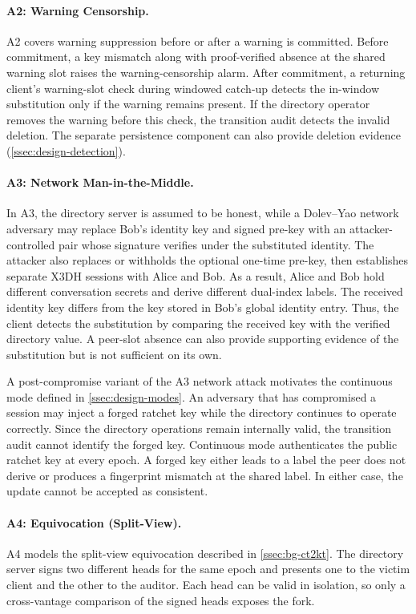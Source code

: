 \label{sc:threat-a2}\paragraph{A2: Warning Censorship.} A2 covers warning suppression
before or after a warning is committed. Before commitment, a key mismatch along with
proof-verified absence at the shared warning slot raises the warning-censorship alarm. After
commitment, a returning client's warning-slot check during windowed catch-up detects the in-window
substitution only if the warning remains present. If the directory operator removes the warning
before this check, the transition audit detects the invalid deletion. The separate persistence
component can also provide deletion evidence (\cref{ssec:design-detection}).

\label{sc:threat-a3}\paragraph{A3: Network Man-in-the-Middle.} In A3, the directory
server is assumed to be honest, while a Dolev--Yao network adversary may replace Bob's identity key
and signed pre-key with an attacker-controlled pair whose signature verifies under the substituted
identity. The attacker also replaces or withholds the optional one-time pre-key, then establishes
separate X3DH sessions with Alice and Bob. As a result, Alice and Bob hold different conversation
secrets and derive different dual-index labels. The received identity key differs from the key
stored in Bob's global identity entry. Thus, the client detects the substitution by comparing the
received key with the verified directory value. A peer-slot absence can also provide supporting
evidence of the substitution but is not sufficient on its own.

A post-compromise variant of the A3 network attack motivates the continuous mode defined in
\cref{ssec:design-modes}. An adversary that has compromised a session may inject a forged ratchet
key while the directory continues to operate correctly. Since the directory operations remain
internally valid, the transition audit cannot identify the forged key. Continuous mode authenticates
the public ratchet key at every epoch. A forged key either leads to a label the peer does not derive
or produces a fingerprint mismatch at the shared label. In either case, the update cannot be
accepted as consistent.

\label{sc:threat-a4}\paragraph{A4: Equivocation (Split-View).} A4 models the split-view
equivocation described in \cref{ssec:bg-ct2kt}. The directory server signs two different heads for
the same epoch and presents one to the victim client and the other to the auditor. Each head can be
valid in isolation, so only a cross-vantage comparison of the signed heads exposes the fork.

